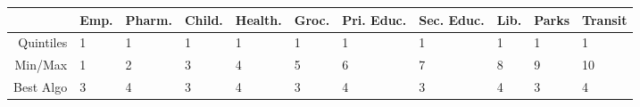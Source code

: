 \documentclass[11pt, a4paper]{article}
\begin{document}
\pagestyle{empty}





\begin{table}[ht]
\centering
\begin{tabular}{rllllllllll}
  \hline
 & Emp. & Pharm. & Child. & Health. & Groc. & Pri. Educ. & Sec. Educ. & Lib. & Parks & Transit \\ 
  \hline
Quintiles & 1 & 1 & 1 & 1 & 1 & 1 & 1 & 1 & 1 & 1 \\ 
  Min/Max &  1 &  2 &  3 &  4 &  5 &  6 &  7 &  8 &  9 & 10 \\ 
  Best Algo & 3 & 4 & 3 & 4 & 3 & 4 & 3 & 4 & 3 & 4 \\ 
   \hline
\end{tabular}
\end{table}
\end{document}
